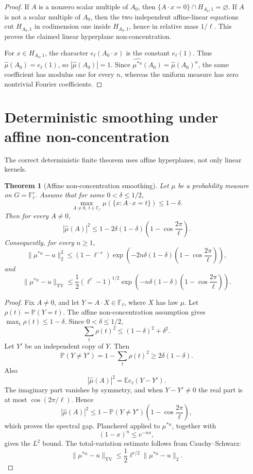 \documentclass[11pt]{article}
\newtheorem{theorem}{Theorem}
\newcommand{\F}{\mathbb F}
\newcommand{\E}{\mathbb E}
\newcommand{\TV}{\mathrm{TV}}
\begin{document}
\begin{proof}
If \(A\) is a nonzero scalar multiple of \(A_0\), then \(\{A\cdot x=0\}\cap H_{A_0,1}=\varnothing\).  If \(A\) is not a scalar multiple of \(A_0\), then the two independent affine-linear equations cut \(H_{A_0,1}\) in codimension one inside \(H_{A_0,1}\), hence in relative mass \(1/\ell\).  This proves the claimed linear hyperplane non-concentration.

For \(x\in H_{A_0,1}\), the character \(e_\ell(A_0\cdot x)\) is the constant \(e_\ell(1)\).  Thus \(\widehat\mu(A_0)=e_\ell(1)\), so \(|\widehat\mu(A_0)|=1\).  Since \(\widehat{\mu^{*n}}(A_0)=\widehat\mu(A_0)^n\), the same coefficient has modulus one for every \(n\), whereas the uniform measure has zero nontrivial Fourier coefficients.
\end{proof}

\section{Deterministic smoothing under affine non-concentration}

The correct deterministic finite theorem uses affine hyperplanes, not only linear kernels.

\begin{theorem}[Affine non-concentration smoothing]\label{T:affine-smoothing}
Let \(\mu\) be a probability measure on \(G=\F_\ell^r\).  Assume that for some \(0<\delta\le1/2\),
\[
\max_{A\ne0,\ t\in\F_\ell}\mu(\{x:A\cdot x=t\})\le1-\delta.
\]
Then for every \(A\ne0\),
\[
|\widehat\mu(A)|^2
\le
1-2\delta(1-\delta)
\left(1-\cos\frac{2\pi}{\ell}\right).
\]
Consequently, for every \(n\ge1\),
\[
\|\mu^{*n}-u\|_2^2
\le
(1-\ell^{-r})
\exp\left(
-2n\delta(1-\delta)
\left(1-\cos\frac{2\pi}{\ell}\right)
\right),
\]
and
\[
\|\mu^{*n}-u\|_{\TV}
\le
\frac12(\ell^r-1)^{1/2}
\exp\left(
-n\delta(1-\delta)
\left(1-\cos\frac{2\pi}{\ell}\right)
\right).
\]
\end{theorem}

\begin{proof}
Fix \(A\ne0\), and let \(Y=A\cdot X\in\F_\ell\), where \(X\) has law \(\mu\).  Let \(\rho(t)=\mathbb P(Y=t)\).  The affine non-concentration assumption gives \(\max_t\rho(t)\le1-\delta\).  Since \(0<\delta\le1/2\),
\[
\sum_t\rho(t)^2\le(1-\delta)^2+\delta^2.
\]
Let \(Y'\) be an independent copy of \(Y\).  Then
\[
\mathbb P(Y\ne Y')
=1-\sum_t\rho(t)^2
\ge2\delta(1-\delta).
\]
Also
\[
|\widehat\mu(A)|^2
=
\E e_\ell(Y-Y').
\]
The imaginary part vanishes by symmetry, and when \(Y-Y'\ne0\) the real part is at most \(\cos(2\pi/\ell)\).  Hence
\[
|\widehat\mu(A)|^2
\le
1-\mathbb P(Y\ne Y')
\left(1-\cos\frac{2\pi}{\ell}\right),
\]
which proves the spectral gap.  Plancherel applied to \(\mu^{*n}\), together with
\[
(1-x)^n\le e^{-nx},
\]
gives the \(L^2\) bound.  The total-variation estimate follows from Cauchy--Schwarz:
\[
\|\mu^{*n}-u\|_{\TV}
\le\frac12\ell^{r/2}\|\mu^{*n}-u\|_2.
\]
\end{proof}
\end{document}
